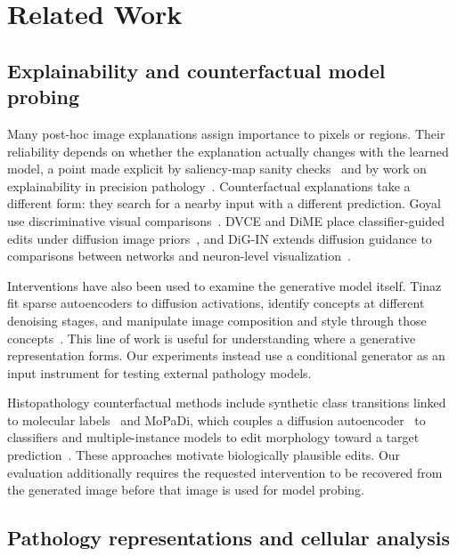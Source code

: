 \section{Related Work}
\label{sec:related}

\subsection{Explainability and counterfactual model probing}

Many post-hoc image explanations assign importance to pixels or regions. Their reliability depends on whether the explanation actually changes with the learned model, a point made explicit by saliency-map sanity checks~\cite{adebayo2018sanity} and by work on explainability in precision pathology~\cite{klauschen2024xai}. Counterfactual explanations take a different form: they search for a nearby input with a different prediction. Goyal \etal{} use discriminative visual comparisons~\cite{goyal2019counterfactual}. DVCE and DiME place classifier-guided edits under diffusion image priors~\cite{augustin2022dvce,jeanneret2022dime}, and DiG-IN extends diffusion guidance to comparisons between networks and neuron-level visualization~\cite{augustin2024digin}.

Interventions have also been used to examine the generative model itself. Tinaz \etal{} fit sparse autoencoders to diffusion activations, identify concepts at different denoising stages, and manipulate image composition and style through those concepts~\cite{tinaz2025concepts}. This line of work is useful for understanding where a generative representation forms. Our experiments instead use a conditional generator as an input instrument for testing external pathology models.

Histopathology counterfactual methods include synthetic class transitions linked to molecular labels~\cite{dolezal2023synthetic} and MoPaDi, which couples a diffusion autoencoder~\cite{preechakul2022diffae} to classifiers and multiple-instance models to edit morphology toward a target prediction~\cite{zigutyte2026mopadi}. These approaches motivate biologically plausible edits. Our evaluation additionally requires the requested intervention to be recovered from the generated image before that image is used for model probing.

\subsection{Pathology representations and cellular analysis}

